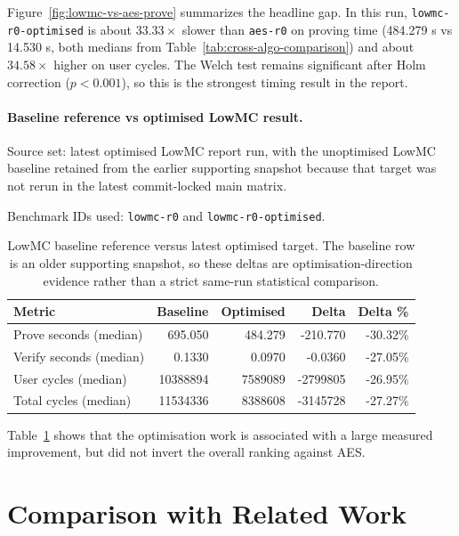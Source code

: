 Figure~\ref{fig:lowmc-vs-aes-prove} summarizes the headline gap. In this run,
\texttt{lowmc-r0-optimised} is about \(33.33\times\) slower than \texttt{aes-r0}
on proving time (484.279 s vs 14.530 s, both medians from
Table~\ref{tab:cross-algo-comparison}) and about \(34.58\times\) higher on user
cycles. The Welch test remains significant after Holm correction
(\(p < 0.001\)), so this is the strongest timing result in the report.

\paragraph{Baseline reference vs optimised LowMC result.}
Source set: latest optimised LowMC report run, with the unoptimised LowMC
baseline retained from the earlier supporting snapshot because that target was
not rerun in the latest commit-locked main matrix.

Benchmark IDs used: \texttt{lowmc-r0} and
\texttt{lowmc-r0-optimised}.

\begin{table}[H]
\centering
\reporttablesetup
\begin{tabular*}{\textwidth}{@{\extracolsep{\fill}}lrrrr@{}}
\hline
Metric & Baseline & Optimised & Delta & Delta \% \\
\hline
Prove seconds (median) & 695.050 & 484.279 & -210.770 & -30.32\% \\
Verify seconds (median) & 0.1330 & 0.0970 & -0.0360 & -27.05\% \\
User cycles (median) & 10388894 & 7589089 & -2799805 & -26.95\% \\
Total cycles (median) & 11534336 & 8388608 & -3145728 & -27.27\% \\
\hline
\end{tabular*}
\caption{LowMC baseline reference versus latest optimised target. The baseline
row is an older supporting snapshot, so these deltas are optimisation-direction
evidence rather than a strict same-run statistical comparison.}
\label{tab:lowmc-baseline-vs-optimised}
\end{table}

Table~\ref{tab:lowmc-baseline-vs-optimised} shows that the optimisation work is
associated with a large measured improvement, but did not invert the overall
ranking against AES.

\section{Comparison with Related Work}

